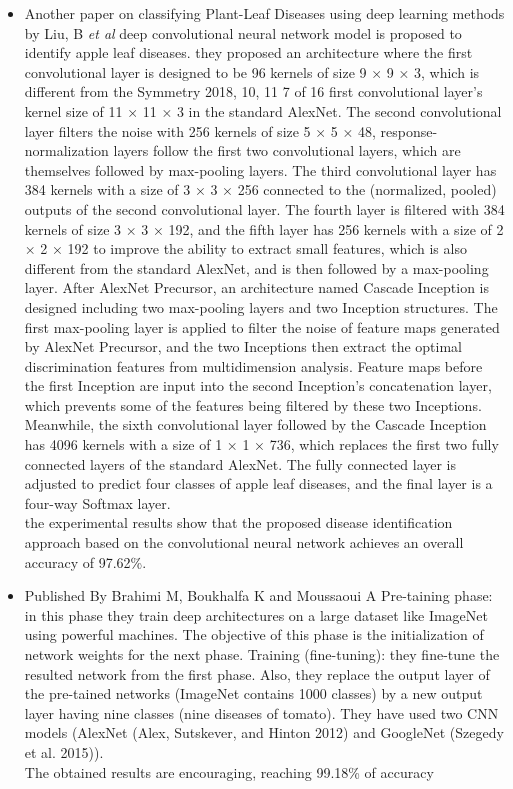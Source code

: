\begin{itemize}
    \item Another paper on classifying Plant-Leaf Diseases using deep learning methods by Liu, B \textit{et al} \cite{art36} deep convolutional neural network model is proposed to identify apple leaf diseases. they proposed an architecture where the first convolutional layer is designed to be 96 kernels of size 9 × 9 × 3, which is different from the Symmetry 2018, 10, 11 7 of 16 first convolutional layer’s kernel size of 11 × 11 × 3 in the standard AlexNet. The second convolutional layer filters the noise with 256 kernels of size 5 × 5 × 48, response-normalization layers follow the first two convolutional layers, which are themselves followed by max-pooling layers. The third convolutional layer has 384 kernels with a size of 3 × 3 × 256 connected to the (normalized, pooled) outputs of the second convolutional layer. The fourth layer is filtered with 384 kernels of size 3 × 3 × 192, and the fifth layer has 256 kernels with a size of 2 × 2 × 192 to improve the ability to extract small features, which is also different from the standard AlexNet, and is then followed by a max-pooling layer. After AlexNet Precursor, an architecture named Cascade Inception is designed including two max-pooling layers and two Inception structures. The first max-pooling layer is applied to filter the noise of feature maps generated by AlexNet Precursor, and the two Inceptions then extract the optimal discrimination features from multidimension analysis. Feature maps before the first Inception are input into the second Inception’s concatenation layer, which prevents some of the features being filtered by these two Inceptions. Meanwhile, the sixth convolutional layer followed by the Cascade Inception has 4096 kernels with a size of 1 × 1 × 736, which replaces the first two fully connected layers of the standard AlexNet. The fully connected layer is adjusted to predict four classes of apple leaf diseases, and the final layer is a four-way Softmax layer.\\ 
    the experimental results show that the proposed disease identification approach based on the convolutional neural network achieves an overall accuracy of 97.62\%.
    \item Published By Brahimi M, Boukhalfa K and Moussaoui A \cite{art37} Pre-taining phase: in this phase they train deep architectures on a large dataset like ImageNet using powerful machines. The objective of this phase is the initialization of network weights for the next phase.
    Training (fine-tuning): they fine-tune the resulted network from the first phase. Also, they replace the output layer of the pre-tained networks (ImageNet contains 1000 classes) by a new output layer having nine classes (nine diseases of tomato). They have used two CNN models (AlexNet (Alex, Sutskever, and Hinton 2012) and GoogleNet (Szegedy et al. 2015)). \\
    The obtained results are encouraging, reaching 99.18\% of accuracy
\end{itemize}

